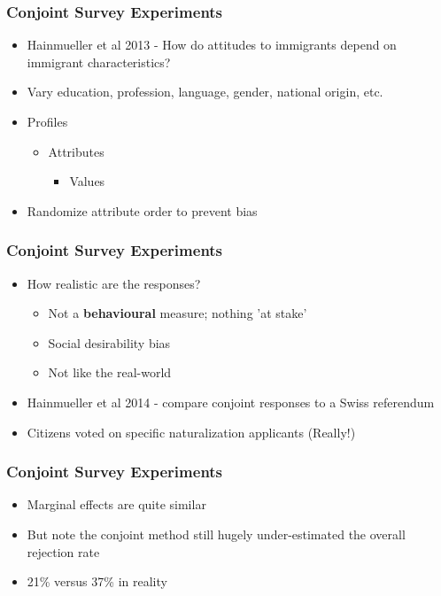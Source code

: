 \documentclass[xcolor=x11names,compress]{beamer}\usepackage[]{graphicx}\usepackage[]{color}
\renewcommand{\(}{\begin{columns}}
\renewcommand{\)}{\end{columns}}
\newcommand{\<}[1]{\begin{column}{#1}}
\renewcommand{\>}{\end{column}}
\begin{document}
\begin{frame}
\frametitle{Conjoint Survey Experiments}
\begin{itemize}
\item Hainmueller et al 2013 - How do attitudes to immigrants depend on immigrant characteristics?
\pause
\item Vary education, profession, language, gender, national origin, etc.
\pause
\item Profiles
\begin{itemize}
\item Attributes
\begin{itemize}
\item Values
\pause
\end{itemize}
\end{itemize}
\item Randomize attribute order to prevent bias
\end{itemize}
\end{frame}





\begin{frame}
\frametitle{Conjoint Survey Experiments}
\begin{itemize}
\item How realistic are the responses?
\pause
\begin{itemize}
\item Not a \textbf{behavioural} measure; nothing 'at stake'
\pause
\item Social desirability bias
\pause
\item Not like the real-world
\pause
\end{itemize}
\item Hainmueller et al 2014 - compare conjoint responses to a Swiss referendum
\pause
\item Citizens voted on specific naturalization applicants (Really!)
\end{itemize}
\end{frame}



\begin{frame}
\frametitle{Conjoint Survey Experiments}
\begin{itemize}
\item Marginal effects are quite similar
\pause
\item But note the conjoint method still hugely under-estimated the overall rejection rate
\item 21\% versus 37\% in reality
\end{itemize}
\end{frame}
\end{document}
